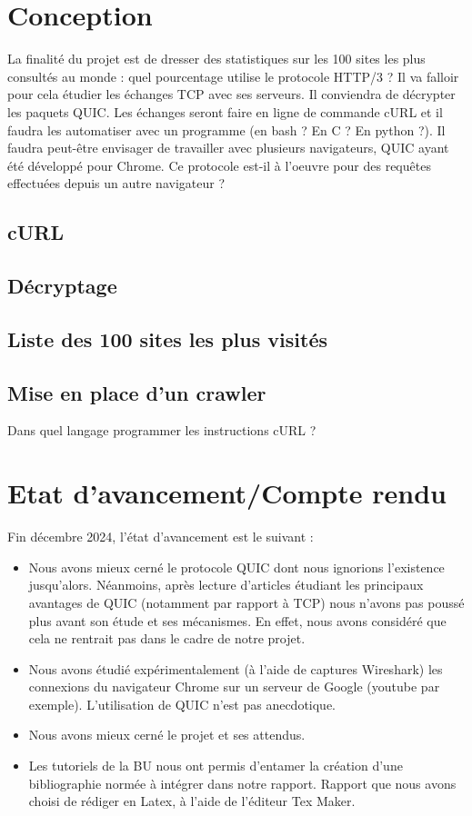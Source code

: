 \documentclass[a4paper,12pt]{article}
\begin{document}
\section{Conception}
La finalité du projet est de dresser des statistiques sur les 100 sites les plus consultés au monde : quel pourcentage utilise le protocole HTTP/3 ? Il va falloir pour cela étudier les échanges TCP avec ses serveurs. Il conviendra de décrypter les paquets QUIC. Les échanges seront faire en ligne de commande cURL et il faudra les automatiser avec un programme (en bash ? En C ? En python ?). Il faudra peut-être envisager de travailler avec plusieurs navigateurs, QUIC ayant été développé pour Chrome. Ce protocole est-il à l'oeuvre pour des requêtes effectuées depuis un autre navigateur ?
\subsection{cURL}

\subsection{Décryptage}
\subsection{Liste des 100 sites les plus visités}
\subsection{Mise en place d'un crawler}
Dans quel langage programmer les instructions cURL ?
\section{Etat d'avancement/Compte rendu}
Fin décembre 2024, l'état d'avancement est le suivant :
\begin{itemize}
\item
Nous avons mieux cerné le protocole QUIC dont nous ignorions l'existence jusqu'alors. Néanmoins, après lecture d'articles étudiant les principaux avantages de QUIC (notamment par rapport à TCP) nous n'avons pas poussé plus avant son étude et ses mécanismes. En effet, nous avons considéré que cela ne rentrait pas dans le cadre de notre projet.

\item
Nous avons étudié expérimentalement (à l'aide de captures Wireshark) les connexions du navigateur Chrome sur un serveur de Google (youtube par exemple). L'utilisation de QUIC n'est pas anecdotique.
\item
Nous avons mieux cerné le projet et ses attendus.
\item
Les tutoriels de la BU nous ont permis d'entamer la création d'une bibliographie normée à intégrer dans notre rapport. Rapport que nous avons choisi de rédiger en Latex, à l'aide de l'éditeur Tex Maker.


\end{itemize}
\end{document}
